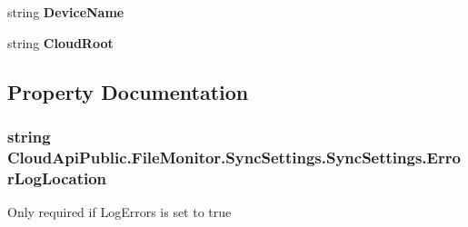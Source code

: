 \begin{DoxyCompactItemize}
\item 
\hypertarget{class_cloud_api_public_1_1_file_monitor_1_1_sync_settings_1_1_sync_settings_a5a697d87f603b406ebe584464fabf85e}{string {\bfseries Device\-Name}}\label{class_cloud_api_public_1_1_file_monitor_1_1_sync_settings_1_1_sync_settings_a5a697d87f603b406ebe584464fabf85e}

\item 
\hypertarget{class_cloud_api_public_1_1_file_monitor_1_1_sync_settings_1_1_sync_settings_a99cb6fee586c9a3f95cc6afbfd88c50a}{string {\bfseries Cloud\-Root}}\label{class_cloud_api_public_1_1_file_monitor_1_1_sync_settings_1_1_sync_settings_a99cb6fee586c9a3f95cc6afbfd88c50a}

\end{DoxyCompactItemize}


\subsection{Property Documentation}
\hypertarget{class_cloud_api_public_1_1_file_monitor_1_1_sync_settings_1_1_sync_settings_aaac8761efcaca44fc36cd1a9aeeed8dc}{
\subsubsection[{Error\-Log\-Location}]{\setlength{\rightskip}{0pt plus 5cm}string Cloud\-Api\-Public.\-File\-Monitor.\-Sync\-Settings.\-Sync\-Settings.\-Error\-Log\-Location\hspace{0.3cm}{\ttfamily [get]}}}\label{class_cloud_api_public_1_1_file_monitor_1_1_sync_settings_1_1_sync_settings_aaac8761efcaca44fc36cd1a9aeeed8dc}


Only required if Log\-Errors is set to true 

